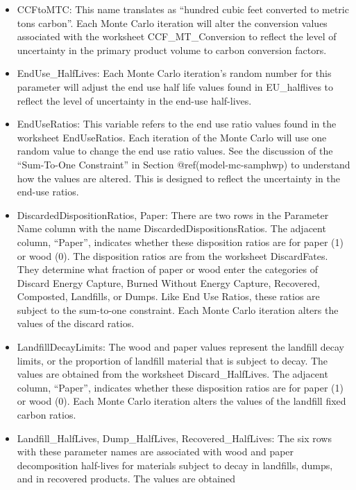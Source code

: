 \documentclass[
  openany]{book}
\begin{document}
\begin{itemize}
  \begin{itemize}
  \item
    CCFtoMTC: This name translates as ``hundred cubic feet converted to
    metric tons carbon''. Each Monte Carlo iteration will alter the
    conversion values associated with the worksheet CCF\_MT\_Conversion
    to reflect the level of uncertainty in the primary product volume to
    carbon conversion factors.
  \item
    EndUse\_HalfLives: Each Monte Carlo iteration's random number for
    this parameter will adjust the end use half life values found in
    EU\_halflives to reflect the level of uncertainty in the end-use
    half-lives.
  \item
    EndUseRatios: This variable refers to the end use ratio values found
    in the worksheet EndUseRatios. Each iteration of the Monte Carlo
    will use one random value to change the end use ratio values. See
    the discussion of the ``Sum-To-One Constraint'' in Section
    @ref(model-mc-samphwp) to understand how the values are altered.
    This is designed to reflect the uncertainty in the end-use ratios.
  \item
    DiscardedDispositionRatios, Paper: There are two rows in the
    Parameter Name column with the name DiscardedDispositionsRatios. The
    adjacent column, ``Paper'', indicates whether these disposition
    ratios are for paper (1) or wood (0). The disposition ratios are
    from the worksheet DiscardFates. They determine what fraction of
    paper or wood enter the categories of Discard Energy Capture, Burned
    Without Energy Capture, Recovered, Composted, Landfills, or Dumps.
    Like End Use Ratios, these ratios are subject to the sum-to-one
    constraint. Each Monte Carlo iteration alters the values of the
    discard ratios.
  \item
    LandfillDecayLimits: The wood and paper values represent the
    landfill decay limits, or the proportion of landfill material that
    is subject to decay. The values are obtained from the worksheet
    Discard\_HalfLives. The adjacent column, ``Paper'', indicates
    whether these disposition ratios are for paper (1) or wood (0). Each
    Monte Carlo iteration alters the values of the landfill fixed carbon
    ratios.
  \item
    Landfill\_HalfLives, Dump\_HalfLives, Recovered\_HalfLives: The six
    rows with these parameter names are associated with wood and paper
    decomposition half-lives for materials subject to decay in
    landfills, dumps, and in recovered products. The values are obtained

\end{itemize}
\end{itemize}
\end{document}
